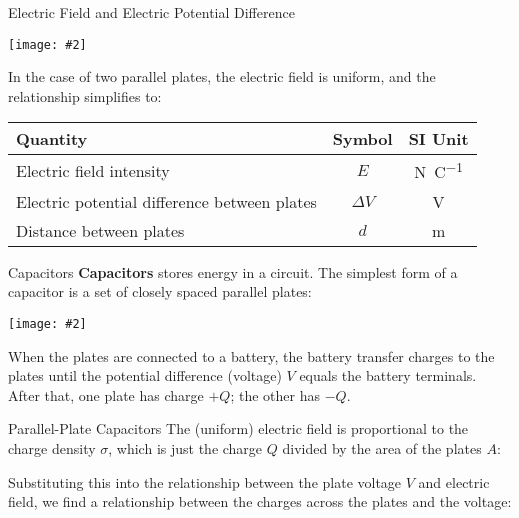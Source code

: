 \documentclass[12pt,aspectratio=169]{beamer}
\newcommand{\pic}[2]{\texttt{[image: \#2]}}
\newcommand{\eq}[2]{\vspace{#1}{\Large\begin{displaymath}#2\end{displaymath}}}
\begin{document}
\begin{frame}{Electric Field and Electric Potential Difference}
  \begin{center}
    \pic{.5}{elfield-600x205.png}
  \end{center}
  \vspace{-.15in}In the case of two parallel plates, the electric field is
  uniform, and the relationship simplifies to:

  \eq{-.2in}{
    \boxed{E=\frac{\Delta V}{d}}
  }
  \begin{center}
    \begin{tabular}{l|c|c}
      \rowcolor{pink}
      \textbf{Quantity} & \textbf{Symbol} & \textbf{SI Unit} \\ \hline
      Electric field intensity & $E$ & \si{\newton\per\coulomb}\\
      Electric potential difference between plates & $\Delta V$ &
      \si{\volt} \\
      Distance between plates       & $d$ & \si{\metre}
    \end{tabular}
  \end{center}
\end{frame}



\begin{frame}{Capacitors}
  \textbf{Capacitors} stores energy in a circuit. The simplest form of a
  capacitor is a set of closely spaced parallel plates:
  \begin{center}
    \pic{.5}{cap19.png}
  \end{center}
  When the plates are connected to a battery, the battery transfer charges to
  the plates until the potential difference (voltage) $V$ equals the battery
  terminals. After that, one plate has charge $+Q$; the other has $-Q$.
\end{frame}



\begin{frame}{Parallel-Plate Capacitors}
  The (uniform) electric field is proportional to the charge density $\sigma$,
  which is just the charge $Q$ divided by the area of the plates $A$:

  \eq{-.2in}{
    E=\frac\sigma\epsilon_0=\frac{Q}{A\epsilon_0}
  }
  
  Substituting this into the relationship between the plate voltage $V$ and
  electric field, we find a relationship between the charges across the plates
  and the voltage:

  \eq{-.2in}{
    V=Ed=\frac{Qd}{A\epsilon_0}\quad\longrightarrow\quad
    \boxed{Q=\left[\frac{A\epsilon_0}{d}\right]V}
  }
\end{frame}
\end{document}
